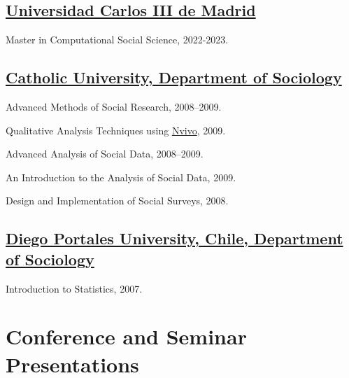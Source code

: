 \documentclass[10pt,letterpaper]{article}
\renewenvironment{itemize}{
  \begin{list}{}{
    \setlength{\leftmargin}{1.5em}
    \setlength{\itemsep}{0.25em}
    \setlength{\parskip}{0pt}
    \setlength{\parsep}{0.25em}
  }
}{
  \end{list}
}
\begin{document}
\subsection*{\href{https://www.uc3m.es/master/computational-social-science}{Universidad Carlos III de Madrid}}

\begin{itemize}
\item Master in Computational Social Science, 2022-2023.
\end{itemize}


\subsection*{\href{http://sociologia.uc.cl/}{Catholic University, Department of Sociology}}

\begin{itemize}
\item Advanced Methods of Social Research, 2008--2009.
\item Qualitative Analysis Techniques using \href{http://www.qsrinternational.com/}{Nvivo}, 2009.
\item Advanced Analysis of Social Data, 2008--2009.
\item An Introduction to the Analysis of Social Data, 2009.
\item Design and Implementation of Social Surveys, 2008.
\end{itemize}

\subsection*{\href{http://www.udp.cl/facultades_carreras/ciencias_sociales-historia/}{Diego Portales University, Chile, Department of Sociology}}

\begin{itemize}
\item Introduction to Statistics, 2007.
\end{itemize}

\section*{Conference and Seminar Presentations}
\end{document}
